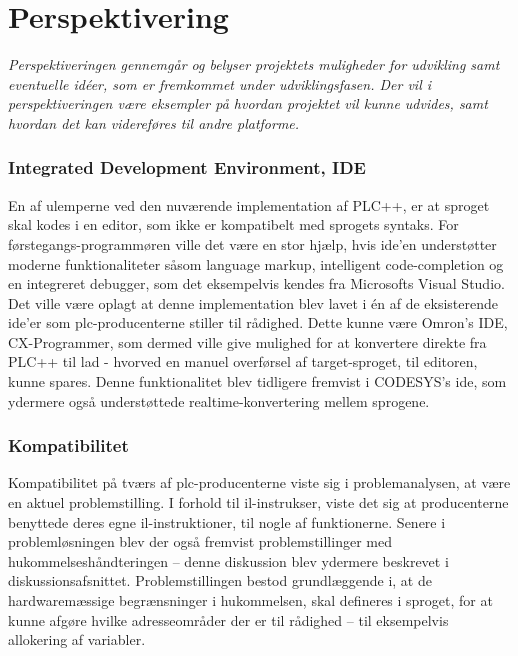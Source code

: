 \chapter{Perspektivering}
\label{sec:Perspektivering}
\textit{Perspektiveringen gennemgår og belyser projektets muligheder for udvikling samt eventuelle idéer, som er fremkommet under udviklingsfasen. Der vil i perspektiveringen være eksempler på hvordan projektet vil kunne udvides, samt hvordan det kan videreføres til andre platforme.}

\subsection*{Integrated Development Environment, IDE}
En af ulemperne ved den nuværende implementation af PLC++, er at sproget skal kodes i en editor, som ikke er kompatibelt med sprogets syntaks. For førstegangs-programmøren ville det være en stor hjælp, hvis \gls{ide}’en understøtter moderne funktionaliteter såsom language markup, intelligent code-completion og en integreret debugger, som det eksempelvis kendes fra Microsofts Visual Studio. \\

\noindent Det ville være oplagt at denne implementation blev lavet i én af de eksisterende \gls{ide}’er som \gls{plc}-producenterne stiller til rådighed. Dette kunne være Omron’s IDE, CX-Programmer, som dermed ville give mulighed for at konvertere direkte fra PLC++ til \gls{lad} - hvorved en manuel overførsel af target-sproget, til editoren, kunne spares. Denne funktionalitet blev tidligere fremvist i CODESYS’s \gls{ide}, som ydermere også understøttede realtime-konvertering mellem sprogene. 

\subsection*{Kompatibilitet}
Kompatibilitet på tværs af \gls{plc}-producenterne viste sig i problemanalysen, at være en aktuel problemstilling. I forhold til \gls{il}-instrukser, viste det sig at producenterne benyttede deres egne \gls{il}-instruktioner, til nogle af funktionerne. Senere i problemløsningen blev der også fremvist problemstillinger med hukommelseshåndteringen – denne diskussion blev ydermere beskrevet i diskussionsafsnittet. Problemstillingen bestod grundlæggende i, at de hardwaremæssige begrænsninger i hukommelsen, skal defineres i sproget, for at kunne afgøre hvilke adresseområder der er til rådighed – til eksempelvis allokering af variabler. 

